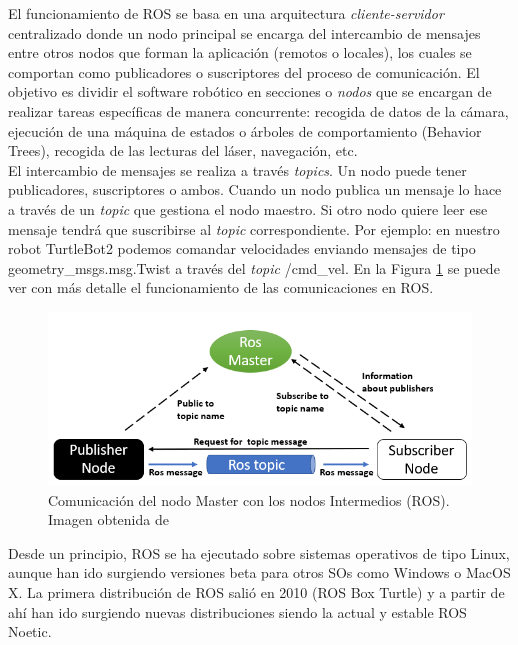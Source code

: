 El funcionamiento de ROS se basa en una arquitectura \textit{cliente-servidor} centralizado donde un nodo principal se encarga del intercambio de mensajes entre otros nodos que forman la aplicación (remotos o locales), los cuales se comportan como publicadores o suscriptores del proceso de comunicación. El objetivo es dividir el software robótico en secciones o \textit{nodos} que se encargan de realizar tareas específicas de manera concurrente: recogida de datos de la cámara, ejecución de una máquina de estados o árboles de comportamiento (Behavior Trees), recogida de las lecturas del láser, navegación, etc.\\

El intercambio de mensajes se realiza a través \textit{topics}. Un nodo puede tener publicadores, suscriptores o ambos. Cuando un nodo publica un mensaje lo hace a través de un \textit{topic} que gestiona el nodo maestro. Si otro nodo quiere leer ese mensaje tendrá que suscribirse al \textit{topic} correspondiente. Por ejemplo: en nuestro robot TurtleBot2 podemos comandar velocidades enviando mensajes de tipo geometry\_msgs.msg.Twist a través del \textit{topic} /cmd\_vel. En la Figura \ref{fig:ros_master_comunicacion} se puede ver con más detalle el funcionamiento de las comunicaciones en ROS.\\

\begin{figure} [H]
  \begin{center}
    \includegraphics[width=15cm]{imagenes/cap3/ros_master_communication.png}
  \end{center}
  \caption[Comunicación del nodo Master con los nodos Intermedios (ROS)]{Comunicación del nodo Master con los nodos Intermedios (ROS). Imagen obtenida de \cite{ros_master}}
  \label{fig:ros_master_comunicacion}
\end{figure}

Desde un principio, ROS se ha ejecutado sobre sistemas operativos de tipo Linux, aunque han ido surgiendo versiones beta para otros SOs como Windows o MacOS X. La primera distribución de ROS salió en 2010 (ROS Box Turtle) y a partir de ahí han ido surgiendo nuevas distribuciones siendo la actual y estable ROS Noetic.\\

